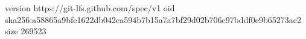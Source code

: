 version https://git-lfs.github.com/spec/v1
oid sha256:a58865a9bfe1622db042ca594b7b15a7a7bf29d02b706c97bddf0e9b65273ae2
size 269523
